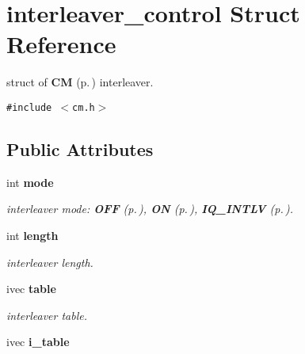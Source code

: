 \section{interleaver\_\-control  Struct Reference}
\label{structinterleaver__control}
struct of {\bf CM} {\rm (p.\,\pageref{classCM})} interleaver. 


{\tt \#include $<$cm.h$>$}

\subsection*{Public Attributes}
\begin{CompactItemize}
\item 
{}
int {\bf mode}\label{structinterleaver__control_m0}

\begin{CompactList}\small\item\em interleaver mode: {\bf OFF} {\rm (p.\,\pageref{cm_8h_a4})}, {\bf ON} {\rm (p.\,\pageref{cm_8h_a5})}, {\bf IQ\_\-INTLV} {\rm (p.\,\pageref{cm_8h_a6})}.\item\end{CompactList}\item 
{}
int {\bf length}\label{structinterleaver__control_m1}

\begin{CompactList}\small\item\em interleaver length.\item\end{CompactList}\item 
{}
ivec {\bf table}\label{structinterleaver__control_m2}

\begin{CompactList}\small\item\em interleaver table.\item\end{CompactList}\item 
{}
ivec {\bf i\_\-table}\label{structinterleaver__control_m3}


\end{CompactItemize}

